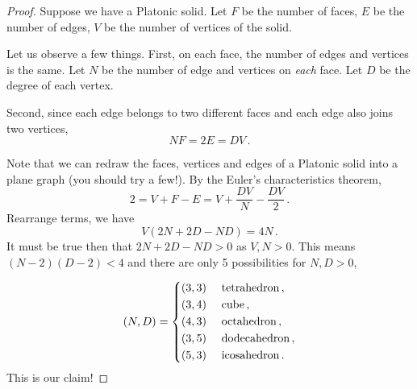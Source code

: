 \begin{proof}
    Suppose we have a Platonic solid.
    Let $F$ be the number of faces, $E$ be the number of edges, $V$ be the number
    of vertices of the solid.

    Let us observe a few things.
    First, on each face, the number of edges and vertices is the same.
    Let $N$ be the number of edge and vertices on \emph{each} face. 
    Let $D$ be the degree of each vertex.

    Second, since each edge belongs to two different faces and each 
    edge also joins two vertices,
    \begin{equation*}
        NF = 2E = DV \,.
    \end{equation*}

    Note that we can redraw the faces, vertices and edges of a Platonic solid
    into a plane graph (you should try a few!).
    By the Euler's characteristics theorem,
    \begin{equation*}
        2 = V + F - E   = V + \frac{DV}{N} - \frac{DV}{2} \,. 
    \end{equation*}
    Rearrange terms, we have
    \begin{equation*}
        V(2N + 2D - ND) = 4N \,.
    \end{equation*}
    It must be true then that $2N + 2D - ND > 0$ as $V, N >0$.
    This means $(N- 2)(D-2) <4$ and there are only 5 possibilities for $N, D >0$,

    \begin{equation*}
        (N,D) = \begin{dcases}
            (3,3) \quad \text{ tetrahedron}\,, \\
            (3,4) \quad \text{ cube}\,, \\
            (4,3) \quad \text{ octahedron}\,, \\
            (3,5) \quad \text{ dodecahedron}\,, \\
            (5,3) \quad \text{ icosahedron} \,.
        \end{dcases}
    \end{equation*}
    This is our claim!
\end{proof}


